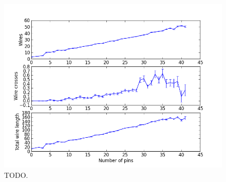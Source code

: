 \begin{figure}[H]
\begin{center}
\includegraphics[width=\textwidth]{Images/final_algorithm_quality_trend.png}
\caption{TODO.}
\label{fig:final_quality_trend}
\end{center}
\end{figure}
